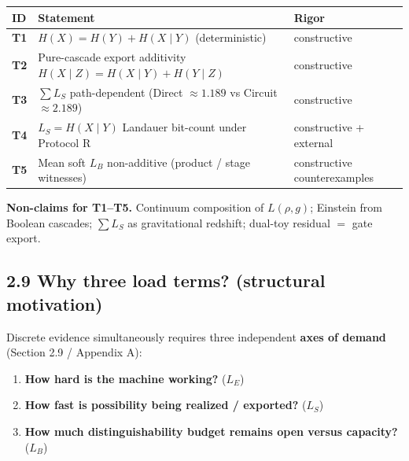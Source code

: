 \documentclass[
  11pt,
]{article}
\newcounter{none} %
\providecommand{\tightlist}{%
  \setlength{\itemsep}{0pt}\setlength{\parskip}{0pt}}
\begin{document}
{\def\LTcaptype{none} %
\begin{longtable}[]{@{}
  >{\raggedright\arraybackslash}p{}
  >{\raggedright\arraybackslash}p{}
  >{\raggedright\arraybackslash}p{}@{}}
\toprule\noalign{}
\begin{minipage}[b]{\linewidth}\raggedright
ID
\end{minipage} & \begin{minipage}[b]{\linewidth}\raggedright
Statement
\end{minipage} & \begin{minipage}[b]{\linewidth}\raggedright
Rigor
\end{minipage} \\
\midrule\noalign{}
\endhead
\bottomrule\noalign{}
\endlastfoot
\textbf{T1} & \(H(X)=H(Y)+H(X\mid Y)\) (deterministic) & constructive \\
\textbf{T2} & Pure-cascade export additivity
\(H(X\mid Z)=H(X\mid Y)+H(Y\mid Z)\) & constructive \\
\textbf{T3} & \(\sum L_S\) path-dependent (Direct \(\approx 1.189\) vs
Circuit \(\approx 2.189\)) & constructive \\
\textbf{T4} & \(L_S=H(X\mid Y)\) Landauer bit-count under Protocol R &
constructive + external \\
\textbf{T5} & Mean soft \(L_B\) non-additive (product / stage witnesses)
& constructive counterexamples \\
\end{longtable}
}

\textbf{Non-claims for T1--T5.} Continuum composition of \(L(\rho,g)\);
Einstein from Boolean cascades; \(\sum L_S\) as gravitational redshift;
dual-toy residual \(=\) gate export.

\subsection{2.9 Why three load terms? (structural
motivation)}\label{why-three-load-terms-structural-motivation}

Discrete evidence simultaneously requires three independent \textbf{axes
of demand} (Section 2.9 / Appendix A):

\begin{enumerate}
\def\labelenumi{\arabic{enumi}.}
\tightlist
\item
  \textbf{How hard is the machine working?} (\(L_E\))\\
\item
  \textbf{How fast is possibility being realized / exported?}
  (\(L_S\))\\
\item
  \textbf{How much distinguishability budget remains open versus
  capacity?} (\(L_B\))
\end{enumerate}
\end{document}
